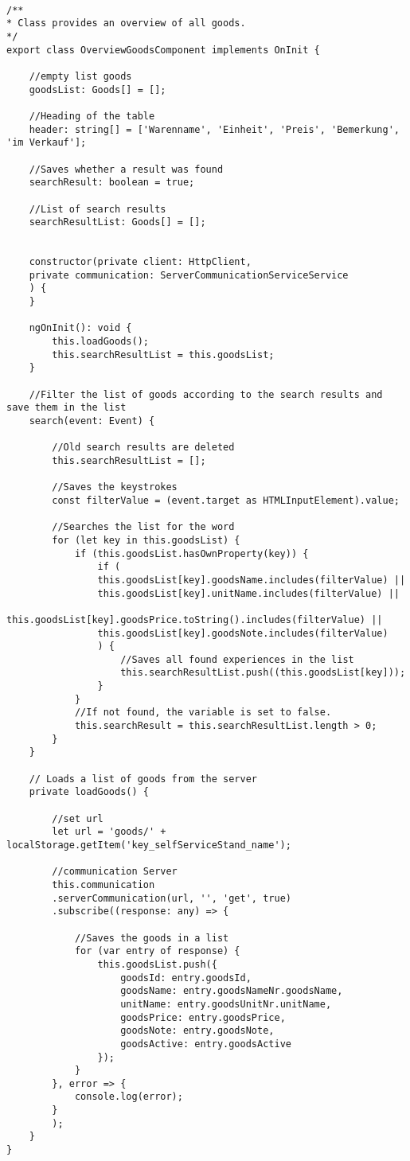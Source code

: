 \lstset{language=java}
\begin{lstlisting}[frame=tb, caption={Das Listing zeigt die TypeScript-Datei change-goods.ts }, label={lst:main-screen.component2}]

/**
* Class provides an overview of all goods.
*/
export class OverviewGoodsComponent implements OnInit {
	
	//empty list goods
	goodsList: Goods[] = [];
	
	//Heading of the table
	header: string[] = ['Warenname', 'Einheit', 'Preis', 'Bemerkung', 'im Verkauf'];
	
	//Saves whether a result was found
	searchResult: boolean = true;
	
	//List of search results
	searchResultList: Goods[] = [];
	
	
	constructor(private client: HttpClient,
	private communication: ServerCommunicationServiceService
	) {
	}
	
	ngOnInit(): void {
		this.loadGoods();
		this.searchResultList = this.goodsList;
	}
	
	//Filter the list of goods according to the search results and save them in the list
	search(event: Event) {
		
		//Old search results are deleted
		this.searchResultList = [];
		
		//Saves the keystrokes
		const filterValue = (event.target as HTMLInputElement).value;
		
		//Searches the list for the word
		for (let key in this.goodsList) {
			if (this.goodsList.hasOwnProperty(key)) {
				if (
				this.goodsList[key].goodsName.includes(filterValue) ||
				this.goodsList[key].unitName.includes(filterValue) ||
				this.goodsList[key].goodsPrice.toString().includes(filterValue) ||
				this.goodsList[key].goodsNote.includes(filterValue)
				) {
					//Saves all found experiences in the list
					this.searchResultList.push((this.goodsList[key]));
				}
			}
			//If not found, the variable is set to false.
			this.searchResult = this.searchResultList.length > 0;
		}
	}
	
	// Loads a list of goods from the server
	private loadGoods() {
		
		//set url
		let url = 'goods/' + localStorage.getItem('key_selfServiceStand_name');
		
		//communication Server
		this.communication
		.serverCommunication(url, '', 'get', true)
		.subscribe((response: any) => {
			
			//Saves the goods in a list
			for (var entry of response) {
				this.goodsList.push({
					goodsId: entry.goodsId,
					goodsName: entry.goodsNameNr.goodsName,
					unitName: entry.goodsUnitNr.unitName,
					goodsPrice: entry.goodsPrice,
					goodsNote: entry.goodsNote,
					goodsActive: entry.goodsActive
				});
			}
		}, error => {
			console.log(error);
		}
		);
	}
}
\end{lstlisting}
